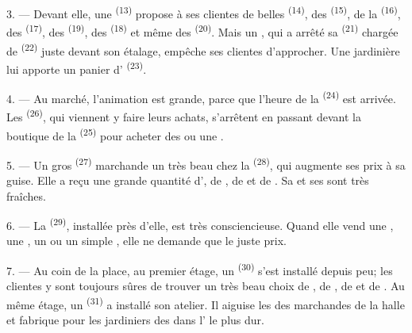 3. --- Devant elle, une  \textsuperscript{(13)}
propose à ses clientes de belles  \textsuperscript{(14)}, des
 \textsuperscript{(15)}, de la 
\textsuperscript{(16)}, des  \textsuperscript{(17)}, des
 \textsuperscript{(19)}, des 
\textsuperscript{(18)} et même des  \textsuperscript{(20)}.
Mais un , qui a arrêté sa 
\textsuperscript{(21)} chargée de 
\textsuperscript{(22)} juste devant son étalage, empêche ses clientes
d'approcher. Une jardinière lui apporte un panier d'
\textsuperscript{(23)}.

\VUsaut{4.0mm}
\VUsaut{3.0mm}

4. --- Au marché, l'animation est grande, parce que l'heure de la  \textsuperscript{(24)} est arrivée. Les 
\textsuperscript{(26)}, qui viennent y faire leurs achats, s'arrêtent en passant
devant la boutique de la  \textsuperscript{(25)}
pour acheter des  ou une .

5. --- Un gros  \textsuperscript{(27)} marchande un très beau
 chez la  \textsuperscript{(28)}, qui augmente
ses prix à sa guise. Elle a reçu une grande quantité d', de
, de  et de . Sa  et
ses  sont très fraîches.

\VUsaut{4.0mm}
\VUsaut{3.0mm}

6. --- La \textsuperscript{(29)},
installée près d'elle, est très consciencieuse. Quand elle vend une
, une , un  ou un simple
, elle ne demande que le juste prix.

7. --- Au coin de la place, au premier étage, un 
\textsuperscript{(30)} s'est installé depuis peu; les clientes y sont toujours
sûres de trouver un très beau choix de , de ,
de  et de . Au même étage, un
 \textsuperscript{(31)} a installé son atelier. Il aiguise les
 des marchandes de la halle et fabrique pour les jardiniers des
 dans l' le plus dur.

